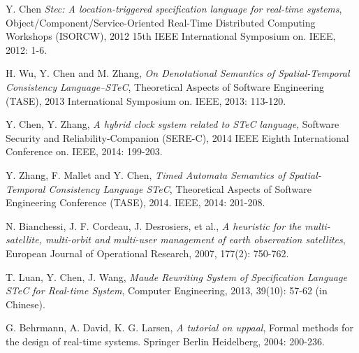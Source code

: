 \begin{thebibliography}{2}
	Y. Chen \emph{Stec: A location-triggered specification language for real-time systems}, Object/Component/Service-Oriented Real-Time Distributed Computing Workshops (ISORCW), 2012 15th IEEE International Symposium on. IEEE, 2012: 1-6.
	
	H. Wu, Y. Chen and M. Zhang, \emph{On Denotational Semantics of Spatial-Temporal Consistency Language--STeC}, Theoretical Aspects of Software Engineering (TASE), 2013 International Symposium on. IEEE, 2013: 113-120.
	
	Y. Chen, Y. Zhang, \emph{A hybrid clock system related to STeC language}, Software Security and Reliability-Companion (SERE-C), 2014 IEEE Eighth International Conference on. IEEE, 2014: 199-203.
	
	Y. Zhang, F. Mallet and Y. Chen, \emph{Timed Automata Semantics of Spatial-Temporal Consistency Language STeC}, Theoretical Aspects of Software Engineering Conference (TASE), 2014. IEEE, 2014: 201-208.
	
	N. Bianchessi, J. F. Cordeau, J. Desrosiers, et al., \emph{A heuristic for the multi-satellite, multi-orbit and multi-user management of earth observation satellites}, European Journal of Operational Research, 2007, 177(2): 750-762.
	
	T. Luan, Y. Chen, J. Wang, \emph{Maude Rewriting System of Specification Language STeC for Real-time System}, Computer Engineering, 2013, 39(10): 57-62 (in Chinese).
	
	G. Behrmann, A. David, K. G. Larsen, \emph{A tutorial on uppaal}, Formal methods for the design of real-time systems. Springer Berlin Heidelberg, 2004: 200-236.
	
	
\end{thebibliography}
